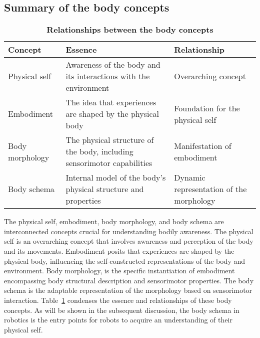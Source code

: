 
\subsection{Summary of the body concepts}
\begin{table}[t!]
	\begin{center}
		\begin{tabular}{ |m{}|m{}|m{}| } 
			\hline
			\textbf{Concept} & \textbf{Essence} & \textbf{Relationship} \\ 
			\hline
			Physical self & Awareness of the body and its interactions with the environment & Overarching concept \\ 
			\hline
			Embodiment & The idea that experiences are shaped by the physical body & Foundation for the physical self \\ 
			\hline
			Body morphology & The physical structure of the body, including sensorimotor capabilities & Manifestation of embodiment\\
			\hline		
			Body schema	 & Internal model of the body's physical structure and properties & Dynamic representation of the morphology \\ 
			\hline
		\end{tabular}
	\end{center}
	\caption{\textbf{Relationships between the body concepts}}
	\label{tab:body_concepts}
\end{table}
The physical self, embodiment, body morphology, and body schema are interconnected concepts crucial for understanding bodily awareness. The physical self is an overarching concept that involves awareness and perception of the body and its movements. Embodiment posits that experiences are shaped by the physical body, influencing the self-constructed representations of the body and environment. Body morphology, is the specific instantiation of embodiment encompassing body structural description and sensorimotor properties. The body schema is the adaptable representation of the morphology based on sensorimotor interaction. %
Table~\ref{tab:body_concepts} condenses the essence and relationships of these body concepts. As will be shown in the subsequent discussion, the body schema in robotics is the entry points for robots to acquire an understanding of their physical self.


